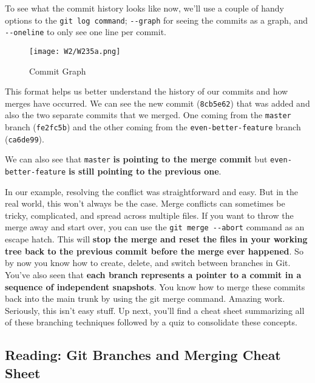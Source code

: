 	To see what the commit history looks like now, we'll use a couple of handy options to the \texttt{git log command}; \verb|--graph| for seeing the commits as a graph, and \verb|--oneline| to only see one line per commit. 
	
	\begin{figure} 
		\caption{Commit Graph}
		\centering
		\texttt{[image: W2/W235a.png]}
		\label{W235a}
	\end{figure}

	This format helps us better understand the history of our commits and how merges have occurred. We can see the new commit (\texttt{8cb5e62}) that was added and also the two separate commits that we merged. One coming from the \texttt{master} branch (\texttt{fe2fc5b}) and the other coming from the \verb|even-better-feature| branch (\texttt{ca6de99}). 
	
	We can also see that \texttt{master} \textbf{is pointing to the merge commit} but \verb|even-better-feature| \textbf{is still pointing to the previous one}. 
	
	In our example, resolving the conflict was straightforward and easy. But in the real world, this won't always be the case. Merge conflicts can sometimes be tricky, complicated, and spread across multiple files. If you want to throw the merge away and start over, you can use the \verb|git merge --abort| command as an escape hatch. This will \textbf{stop the merge and reset the files in your working tree back to the previous commit before the merge ever happened}. So by now you know how to create, delete, and switch between branches in Git. You've also seen that \textbf{each branch represents a pointer to a commit in a sequence of independent snapshots}. You know how to merge these commits back into the main trunk by using the git merge command. Amazing work. Seriously, this isn't easy stuff. Up next, you'll find a cheat sheet summarizing all of these branching techniques followed by a quiz to consolidate these concepts.
	
	\subsection{Reading: Git Branches and Merging Cheat Sheet}

